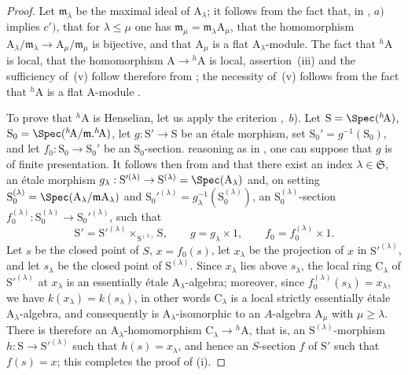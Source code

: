 \begin{proof}
Let $\mathfrak{m}_\lambda$ be the maximal ideal of $\mathrm{A}_\lambda$;
it follows from the fact that, in , $a)$ implies $c')$, that for $\lambda\leq\mu$ one has $\mathfrak{m}_\mu=\mathfrak{m}_\lambda\mathrm{A}_\mu$, that the homomorphism $\mathrm{A}_\lambda/\mathfrak{m}_\lambda\to\mathrm{A}_\mu/\mathfrak{m}_\mu$ is bijective, and that $\mathrm{A}_\mu$ is a flat $\mathrm{A}_\lambda$-module.
The fact that ${}^h\!\mathrm{A}$ is local, that the homomorphism $\mathrm{A}\to{}^h\!\mathrm{A}$ is local, assertion~(iii) and the sufficiency of~(v) follow therefore from ;
the necessity of~(v) follows from the fact that ${}^h\!\mathrm{A}$ is a flat A-module .

To prove that ${}^h\!\mathrm{A}$ is Henselian, let us apply the criterion ,~$b$).
Let $\mathrm{S}=\Spec({}^h\!\mathrm{A})$, $\mathrm{S}_0=\Spec({}^h\!\mathrm{A}/\mathfrak{m}.{}^h\!\mathrm{A})$, let $g:\mathrm{S}'\to\mathrm{S}$ be an \'{e}tale morphism, set $\mathrm{S}_0'=g^{-1}(\mathrm{S}_0)$, and let $f_0:\mathrm{S}_0\to\mathrm{S}_0'$ be an $\mathrm{S}_0$-section.
reasoning as in , one can suppose that $g$ is of finite presentation.
It follows then from  and  that there exist an index $\lambda\in\mathfrak{S}$, an \'etale morphism $g_\lambda:\mathrm{S}'^{(\lambda)}\to\mathrm{S}^{(\lambda)}=\Spec(\mathrm{A}_\lambda)$ and, on setting $\mathrm{S}_0^{(\lambda)}=\Spec(\mathrm{A}_\lambda/\mathfrak{m}\mathrm{A}_\lambda)$ and $\mathrm{S}_0'^{(\lambda)}=g_\lambda^{-1}(\mathrm{S}_0^{(\lambda)})$, an $\mathrm{S}_0^{(\lambda)}$-section $f_0^{(\lambda)}:\mathrm{S}_0^{(\lambda)}\to\mathrm{S}_0'^{(\lambda)}$, such that
\[
\mathrm{S}'=\mathrm{S}'^{(\lambda)}\times_{\mathrm{S}^{(\lambda)}}\mathrm{S},\qquad
g=g_\lambda\times 1,\qquad
f_0=f_0^{(\lambda)}\times 1.
\]
Let $s$ be the closed point of $S$, $x=f_0(s)$, let $x_\lambda$ be the projection of $x$ in $\mathrm{S}'^{(\lambda)}$, and let $s_\lambda$ be the closed point of $\mathrm{S}^{(\lambda)}$.
Since $x_\lambda$ lies above $s_\lambda$, the local ring $\mathrm{C}_\lambda$ of $\mathrm{S}'^{(\lambda)}$ at $x_\lambda$ is an essentially \'etale $\mathrm{A}_\lambda$-algebra;
moreover, since $f_0^{(\lambda)}(s_\lambda)=x_\lambda$, we have $k(x_\lambda)=k(s_\lambda)$, in other words $\mathrm{C}_\lambda$ is a local strictly essentially \'etale $\mathrm{A}_\lambda$-algebra, and consequently  is $\mathrm{A}_\lambda$-isomorphic to an $A$-algebra $\mathrm{A}_\mu$ with $\mu\geq\lambda$.
There is therefore an $\mathrm{A}_\lambda$-homomorphism $\mathrm{C}_\lambda\to{}^h\!\mathrm{A}$, that is, an $\mathrm{S}^{(\lambda)}$-morphism $h:\mathrm{S}\to\mathrm{S}'^{(\lambda)}$ such that $h(s)=x_\lambda$, and hence an $S$-section $f$ of $\mathrm{S}'$ such that $f(s)=x$;
this completes the proof of (i).


\end{proof}
